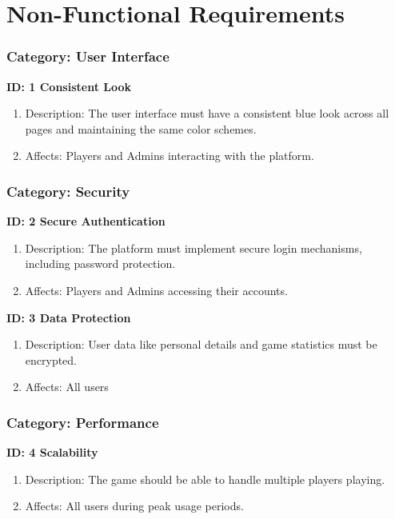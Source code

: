 \clearpage
\section{Non-Functional Requirements}

\subsubsection{Category: User Interface}

\textbf{ID: 1 Consistent Look}
\begin{enumerate}
    \item Description: The user interface must have a consistent blue look  across all pages and maintaining the same color schemes.
    \item Affects: Players and Admins interacting with the platform.
\end{enumerate}

\subsubsection{Category: Security}

\textbf{ID: 2 Secure Authentication}
\begin{enumerate}
    \item Description: The platform must implement secure login mechanisms, including password protection.
    \item Affects: Players and Admins accessing their accounts.
\end{enumerate}

\textbf{ID: 3 Data Protection}
\begin{enumerate}
    \item Description: User data like personal details and game statistics must be encrypted.
    \item Affects: All users
\end{enumerate}

\subsubsection{Category: Performance}

\textbf{ID: 4 Scalability}
\begin{enumerate}
    \item Description: The game should be able to handle multiple players playing.
    \item Affects: All users during peak usage periods.
\end{enumerate}

